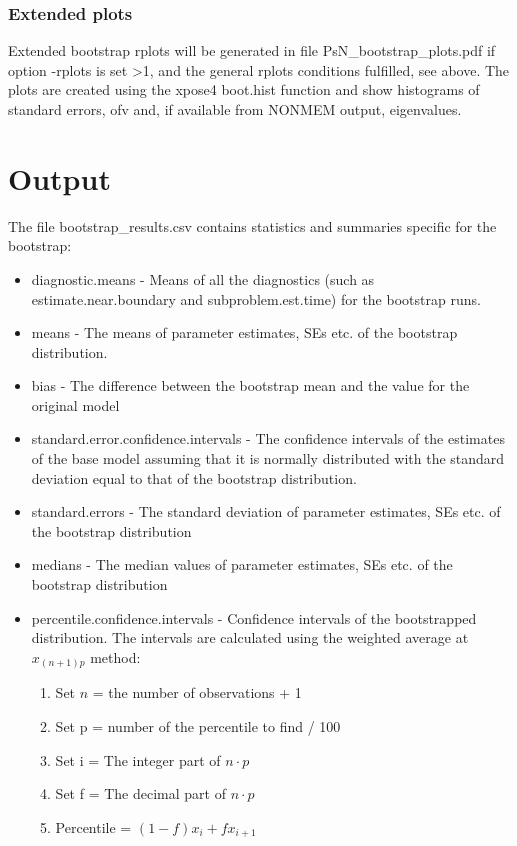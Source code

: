 \subsubsection*{Extended plots}
Extended bootstrap rplots will be generated in file PsN\_bootstrap\_plots.pdf
if option -rplots is set >1,
and the general rplots conditions fulfilled, see above.
The plots are created using the xpose4 boot.hist function
and show histograms of standard errors, ofv and, if available
from NONMEM output, eigenvalues.

\section{Output}

The file bootstrap\_results.csv contains statistics and summaries specific for the bootstrap:
\begin{itemize}
    \item diagnostic.means - Means of all the diagnostics (such as estimate.near.boundary and subproblem.est.time) for the bootstrap runs.
    \item means - The means of parameter estimates, SEs etc. of the bootstrap distribution.
    \item bias - The difference between the bootstrap mean and the value for the original model
    \item standard.error.confidence.intervals - The confidence intervals of the estimates of the base model assuming that it is normally distributed with the standard deviation equal to that of the bootstrap distribution. 
    \item standard.errors - The standard deviation of parameter estimates, SEs etc. of the bootstrap distribution
    \item medians - The median values of parameter estimates, SEs etc. of the bootstrap distribution
    \item percentile.confidence.intervals - Confidence intervals of the bootstrapped distribution. The intervals are calculated using the weighted average at $x_{(n+1)p}$ method:
    \begin{enumerate}
        \item Set $n$ = the number of observations + 1
        \item Set p = number of the percentile to find / 100
        \item Set i = The integer part of $n\cdot p$
        \item Set f = The decimal part of $n\cdot p$
        \item Percentile = $(1-f)x_i + fx_{i+1}$
    \end{enumerate}
\end{itemize}

